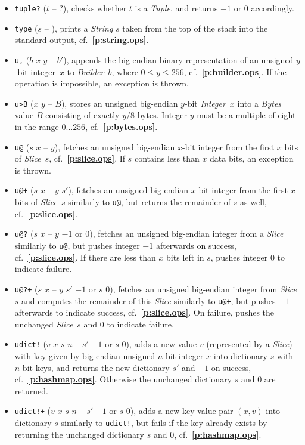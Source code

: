\documentclass[12pt,oneside]{article}
\def\refpoint#1{{\rm\textbf{\ref{#1}}}}
\let\ptref=\refpoint
\begin{document}
\begin{itemize}
\item {\tt tuple?} ($t$ -- $?$), checks whether $t$ is a {\em Tuple}, and returns $-1$ or $0$ accordingly.
\item {\tt type} ($s$ -- ), prints a {\em String\/} $s$ taken from the top of the stack into the standard output, cf.~\ptref{p:string.ops}.
\item {\tt u,} ($b$ $x$ $y$ -- $b'$), appends the big-endian binary representation of an unsigned $y$-bit integer~$x$ to {\em Builder\/}~$b$, where $0\leq y\leq 256$, cf.~\ptref{p:builder.ops}. If the operation is impossible, an exception is thrown.
\item {\tt u>B} ($x$ $y$ -- $B$), stores an unsigned big-endian $y$-bit {\em Integer\/}~$x$ into a {\em Bytes\/} value $B$ consisting of exactly $y/8$ bytes. Integer $y$ must be a multiple of eight in the range $0\ldots256$, cf.~\ptref{p:bytes.ops}.
\item {\tt u@} ($s$ $x$ -- $y$), fetches an unsigned big-endian $x$-bit integer from the first $x$ bits of {\em Slice}~$s$, cf.~\ptref{p:slice.ops}. If $s$ contains less than $x$ data bits, an exception is thrown.
\item {\tt u@+} ($s$ $x$ -- $y$ $s'$), fetches an unsigned big-endian $x$-bit integer from the first $x$ bits of {\em Slice}~$s$ similarly to {\tt u@}, but returns the remainder of $s$ as well, cf.~\ptref{p:slice.ops}.
\item {\tt u@?} ($s$ $x$ -- $y$ $-1$ or $0$), fetches an unsigned big-endian integer from a {\em Slice\/} similarly to {\tt u@}, but pushes integer $-1$ afterwards on success, cf.~\ptref{p:slice.ops}. If there are less than $x$ bits left in $s$, pushes integer $0$ to indicate failure.
\item {\tt u@?+} ($s$ $x$ -- $y$ $s'$ $-1$ or $s$ $0$), fetches an unsigned big-endian integer from {\em Slice\/}~$s$ and computes the remainder of this {\em Slice\/} similarly to {\tt u@+}, but pushes $-1$ afterwards to indicate success, cf.~\ptref{p:slice.ops}. On failure, pushes the unchanged {\em Slice\/}~$s$ and $0$ to indicate failure.
\item {\tt udict!} ($v$ $x$ $s$ $n$ -- $s'$ $-1$ or $s$ $0$), adds a new value $v$ (represented by a {\em Slice\/}) with key given by big-endian unsigned $n$-bit integer $x$ into dictionary $s$ with $n$-bit keys, and returns the new dictionary $s'$ and $-1$ on success, cf.~\ptref{p:hashmap.ops}. Otherwise the unchanged dictionary $s$ and $0$ are returned.
\item {\tt udict!+} ($v$ $x$ $s$ $n$ -- $s'$ $-1$ or $s$ $0$), adds a new key-value pair $(x,v)$ into dictionary $s$ similarly to {\tt udict!}, but fails if the key already exists by returning the unchanged dictionary $s$ and $0$, cf.~\ptref{p:hashmap.ops}.

\end{itemize}
\end{document}
